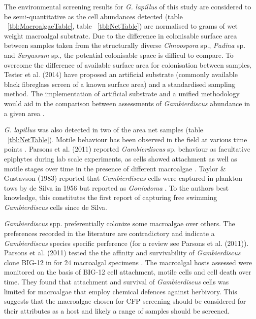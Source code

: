 \documentclass[12pt]{article}
\begin{document}
The environmental screening results for \emph{G. lapillus} of this study are considered to be semi-quantitative as the cell abundances detected (table ~\ref{tbl:MacroalgaeTable}, table ~\ref{tbl:NetTable}) are normalised to grams of wet weight macroalgal substrate. Due to the difference in colonisable surface area between samples taken from the structurally diverse \emph{Chnoospora} sp., \emph{Padina} sp. and \emph{Sargassum} sp., the potential colonisable space is difficul to compare. To overcome the difference of available surface area for colonisation between samples, Tester et al. (2014) have proposed an artificial substrate (commonly available black fibreglass screen of a known surface area) and a standardised sampling method. %
The implementation of artificial substrate and a unified methodology would aid in the comparison between assessments of \emph{Gambierdiscus} abundance in a  given area \cite{tester2014sampling}.

\emph{G. lapillus} was also detected in two of the area net samples (table ~\ref{tbl:NetTable}). Motile behaviour has been observed in the field at various time points \cite{yasumoto1977finding,bomber1987ecology}. Parsons et al. (2011) reported \emph{Gambierdiscus} sp. behaviour as facultative epiphytes during lab scale experiments, as cells showed attachment as well as motile stages over time in the presence of different macroalgae \cite{parsons2011examination}. Taylor \& Gustavson (1983) reported that \emph{Gambierdiscus} cells were captured in plankton tows by de Silva in 1956 but reported as \emph{Goniodoma} \cite{taylor1986underwater}. To the authors best knowledge, this constitutes the first report of capturing free swimming \emph{Gambierdiscus} cells since de Silva. 


\emph{Gambierdiscus} spp. preferentially colonize some macroalgae over others. The preferences recorded in the literature are contradictory and indicate a \emph{Gambierdiscus} species specific perference (for a review see Parsons et al. (2011)).
Parsons et al. (2011) tested the the affinity and survivability of \emph{Gambierdiscus} clone BIG-12 in for 24 macroalgal specimens \cite{parsons2011examination}. The macroalgal hosts assessed were monitored on the basis of BIG-12 cell attachment, motile cells and cell death over time. They found that attachment and survival of \emph{Gambierdiscus} cells was limited for macroalgae that employ chemical defences against herbivory. This suggests that the macroalgae chosen for CFP screening should be considered for their attributes as a host and likely a range of samples should be screened.
\end{document}
